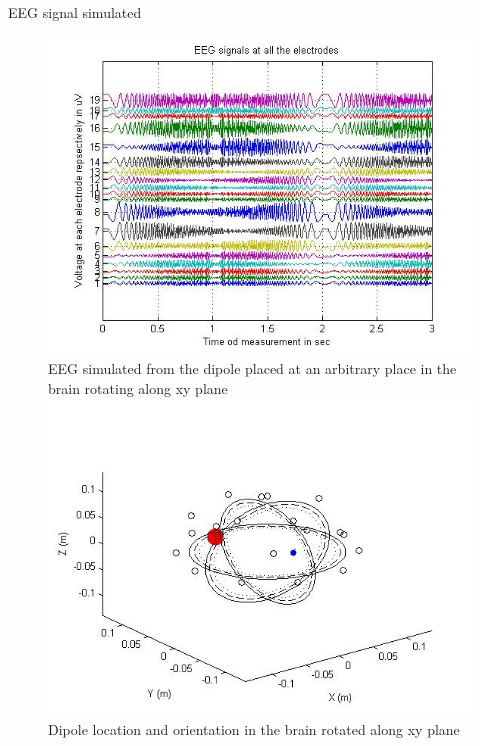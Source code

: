 \documentclass[t,12pt,english
\ifx\beamermode\undefined\else,\beamermode\fi
]{beamer}
\begin{document}
\begin{frame}{EEG signal simulated }
 

\begin{figure}[!htbp]
%
\centering
\includegraphics[width=1\textwidth]{11.jpg}\\
\tiny{EEG simulated from the dipole placed at an arbitrary place in the brain rotating along xy plane }
\endminipage\hfill
{}%
\centering
\includegraphics[width=1\textwidth]{12.jpg}\\
\tiny{Dipole location and orientation in the brain rotated along xy plane}
\endminipage\hfill
\end{figure}

\end{frame}
\end{document}
